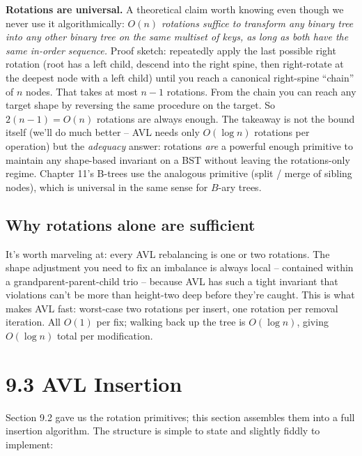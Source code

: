\documentclass[11pt]{article}
\begin{document}
\begin{notebox}
\textbf{Rotations are universal.} A theoretical claim worth knowing
even though we never use it algorithmically: \emph{$O(n)$ rotations
suffice to transform any binary tree into any other binary tree on
the same multiset of keys, as long as both have the same in-order
sequence.} Proof sketch: repeatedly apply the last possible right
rotation (root has a left child, descend into the right spine, then
right-rotate at the deepest node with a left child) until you
reach a canonical right-spine ``chain'' of $n$ nodes. That takes at
most $n - 1$ rotations. From the chain you can reach any target
shape by reversing the same procedure on the target. So
$2(n-1) = O(n)$ rotations are always enough. The takeaway is not
the bound itself (we'll do much better -- AVL needs only $O(\log n)$
rotations per operation) but the \emph{adequacy} answer: rotations
\emph{are} a powerful enough primitive to maintain any
shape-based invariant on a BST without leaving the rotations-only
regime. Chapter 11's B-trees use the analogous primitive
(split / merge of sibling nodes), which is universal in the same
sense for $B$-ary trees.
\end{notebox}

\subsection*{Why rotations alone are sufficient}

It's worth marveling at: every AVL rebalancing is one or two rotations. The shape adjustment you need to fix an imbalance is always local -- contained within a grandparent-parent-child trio -- because AVL has such a tight invariant that violations can't be more than height-two deep before they're caught. This is what makes AVL fast: worst-case two rotations per insert, one rotation per removal iteration. All $O(1)$ per fix; walking back up the tree is $O(\log n)$, giving $O(\log n)$ total per modification.

\section{9.3 AVL Insertion}

Section 9.2 gave us the rotation primitives; this section assembles them into a full insertion algorithm. The structure is simple to state and slightly fiddly to implement:
\end{document}

